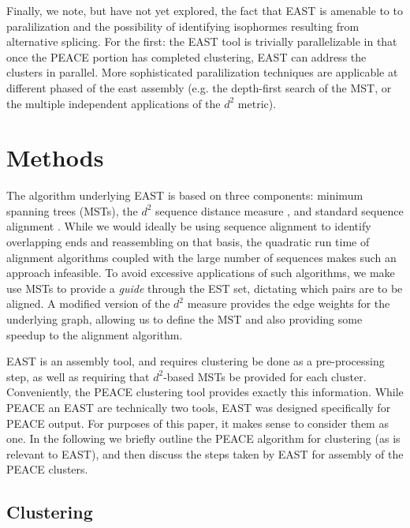 \documentclass[10pt]{bmc_article}
\newcommand{\peace} {{\small PEACE}}
\newcommand{\east} {{\small EAST}}
\newenvironment{bmcformat}{\begin{raggedright}\baselineskip20pt\sloppy\setboolean{publ}{false}}{\end{raggedright}\baselineskip20pt\sloppy}
\begin{document}
\begin{bmcformat}
\vspace{3mm}


Finally, we note, but have not yet explored, the fact that \east\/ is
amenable to to paralilization and the possibility of identifying
isophormes resulting from alternative splicing.  For the first: the
\east\/ tool is trivially parallelizable in that once the \peace\/
portion has completed clustering, \east\/ can address the clusters in
parallel.  More sophisticated paralilization techniques are applicable
at different phased of the east assembly (e.g. the depth-first search
of the MST, or the multiple independent applications of the $d^2$ metric).  

\section*{Methods}

The algorithm underlying \east\/ is based on three components: minimum
spanning trees (MSTs)\cite{Prim57}, the $d^2$ sequence distance
measure \cite{Hide94}, and standard sequence alignment
\cite{Needleman70,Smith81}.  While we would ideally be using sequence
alignment to identify overlapping ends and reassembling on that basis,
the quadratic run time of alignment algorithms coupled with the large
number of sequences makes such an approach infeasible.  To avoid excessive
applications of such algorithms, we make use MSTs to provide a {\it
  guide} through the EST set, dictating which pairs are to be aligned.  A
modified version of the $d^2$ measure provides the edge weights for
the underlying graph, allowing us to define the MST and also providing
some speedup to the alignment algorithm.

\vspace{3mm}

\east\/ is an assembly tool, and requires clustering be
done as a pre-processing step, as well as requiring that $d^2$-based
MSTs be provided for each cluster.  Conveniently, the \peace\/
clustering tool \cite{Rao10} provides exactly this information.  While
\peace\/ an \east\/ are technically two tools, \east\/ was designed
specifically for \peace\/ output.  For purposes of this paper, it
makes sense to consider them as one.  In the following we briefly
outline the \peace\/ algorithm for clustering (as is relevant to
\east\/), and then discuss the steps taken by \east\/ for assembly of
the \peace\/ clusters.

\subsection*{Clustering}


\end{bmcformat}
\end{document}
